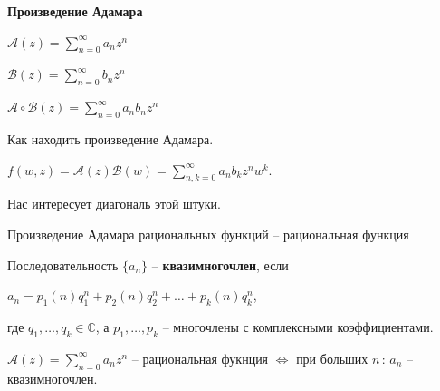 \begin{definition}
    \textbf{Произведение Адамара}

    $\mathcal{A}(z) = \sum_{n = 0}^{\infty} a_nz^n$

    $\mathcal{B}(z) = \sum_{n=0}^{\infty} b_nz^n$

    $\mathcal{A} \circ \mathcal{B} (z) = \sum_{n = 0}^{\infty} a_nb_n z^n$
\end{definition}

\begin{example}
    Как находить произведение Адамара.

    $f(w, z) = \mathcal{A}(z) \mathcal{B}(w) = \sum_{n, k = 0}^{\infty} a_nb_kz^nw^k$.

    Нас интересует диагональ этой штуки.
\end{example}

\begin{theorem}
    Произведение Адамара рациональных функций -- рациональная функция
\end{theorem}

\begin{definition}
    Последовательность $\{a_n\}$ -- \textbf{квазимногочлен}, если

    $a_n = p_1(n)q_1^n + p_2(n)q_2^n + \ldots + p_k(n)q_k^n$,

    где $q_1, \ldots, q_k \in \mathbb{C}$, а $p_1, \ldots, p_k$ -- многочлены с комплексными коэффициентами.
\end{definition}

\begin{lemma}
    $\mathcal{A}(z) = \sum_{n=0}^{\infty} a_n z^n$ -- рациональная фукнция $\Leftrightarrow$ при больших $n \,: \, a_n$ -- квазимногочлен.
\end{lemma}

